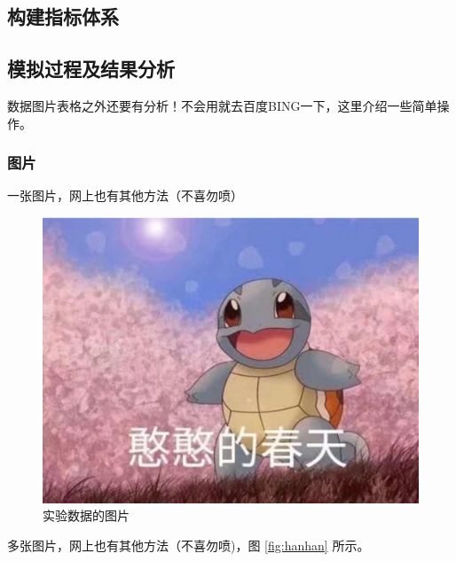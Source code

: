 \documentclass{SUFEThesis}
\begin{document}
\subsection{构建指标体系}


\subsection{模拟过程及结果分析}
数据图片表格之外还要有分析！不会用就去百度BING一下，这里介绍一些简单操作。
\subsubsection{图片}
一张图片，网上也有其他方法（不喜勿喷）
\begin{figure}[!ht]
  \centering
  \includegraphics[width=0.45\linewidth]{图片1.jpg}
  \caption{实验数据的图片}
\end{figure} 
多张图片，网上也有其他方法（不喜勿喷)，图 \ref{fig:hanhan} 所示。
\end{document}
